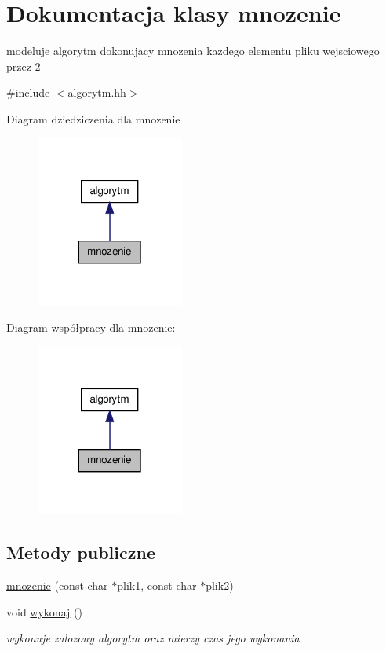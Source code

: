 \hypertarget{classmnozenie}{\section{\-Dokumentacja klasy mnozenie}
\label{classmnozenie}
}


modeluje algorytm dokonujacy mnozenia kazdego elementu pliku wejsciowego przez 2  




{\ttfamily \#include $<$algorytm.\-hh$>$}



\-Diagram dziedziczenia dla mnozenie
\nopagebreak
\begin{figure}[H]
\begin{center}
\leavevmode
\includegraphics[width=138pt]{classmnozenie__inherit__graph}
\end{center}
\end{figure}


\-Diagram współpracy dla mnozenie\-:
\nopagebreak
\begin{figure}[H]
\begin{center}
\leavevmode
\includegraphics[width=138pt]{classmnozenie__coll__graph}
\end{center}
\end{figure}
\subsection*{\-Metody publiczne}
\begin{DoxyCompactItemize}
\item 
\hyperlink{classmnozenie_a7ed17168308545a61ba7097c91cd19dd}{mnozenie} (const char $\ast$plik1, const char $\ast$plik2)
\item 
void \hyperlink{classmnozenie_a2c5dc64610bb16af0ef18d142d6af2c0}{wykonaj} ()
\begin{DoxyCompactList}\small\item\em wykonuje zalozony algorytm oraz mierzy czas jego wykonania \end{DoxyCompactList}\end{DoxyCompactItemize}


